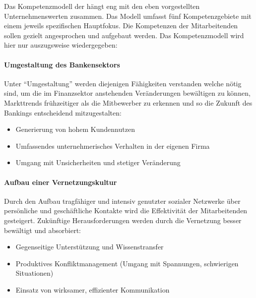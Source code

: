 \begin{sloppypar}
Das Kompetenzmodell der \companyshort{} hängt eng mit den eben vorgestellten Unternehmenswerten zusammen. Das Modell umfasst fünf Kompetenzgebiete mit einem jeweils spezifischen Hauptfokus. Die Kompetenzen der Mitarbeitenden sollen gezielt angesprochen und aufgebaut werden. Das Kompetenzmodell wird hier nur auszugsweise wiedergegeben:
\end{sloppypar}

\paragraph*{Umgestaltung des Bankensektors}\mbox{}
\begin{sloppypar}
Unter "`Umgestaltung"' werden diejenigen Fähigkeiten verstanden welche nötig sind, um die im Finanzsektor anstehenden Veränderungen bewältigen zu können, Markttrends frühzeitiger als die Mitbewerber zu erkennen und so die Zukunft des Bankings entscheidend mitzugestalten:
\begin{itemize}
  \item Generierung von hohem Kundennutzen
  \item Umfassendes unternehmerisches Verhalten in der eigenen Firma 
  \item Umgang mit Unsicherheiten und stetiger Veränderung
\end{itemize}
\end{sloppypar}

\paragraph*{Aufbau einer Vernetzungskultur}\mbox{}
\begin{sloppypar}
Durch den Aufbau tragfähiger und intensiv genutzter sozialer Netzwerke über persönliche und geschäftliche Kontakte wird die Effektivität der Mitarbeitenden gesteigert. Zukünftige Herausforderungen werden durch die Vernetzung besser bewältigt und absorbiert:
\begin{itemize}
  \item Gegenseitige Unterstützung und Wissenstransfer
  \item Produktives Konfliktmanagement (Umgang mit Spannungen, schwierigen Situationen) 
  \item Einsatz von wirksamer, effizienter Kommunikation 
\end{itemize}
\end{sloppypar}

